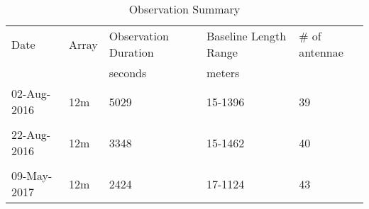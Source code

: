 
\begin{table*}[htp]
\centering
\caption{Observation Summary}
\begin{tabular}{lllll}
\label{tab:observations}
Date & Array & Observation Duration &  Baseline Length Range  & \# of antennae\\
     &       & seconds              & meters                    & \\
\hline

02-Aug-2016 & 12m & 5029 & 15-1396 & 39\\\\
22-Aug-2016 & 12m & 3348 & 15-1462 & 40\\\\
09-May-2017 & 12m & 2424 & 17-1124 & 43\\

\hline
\end{tabular}
\end{table*}
